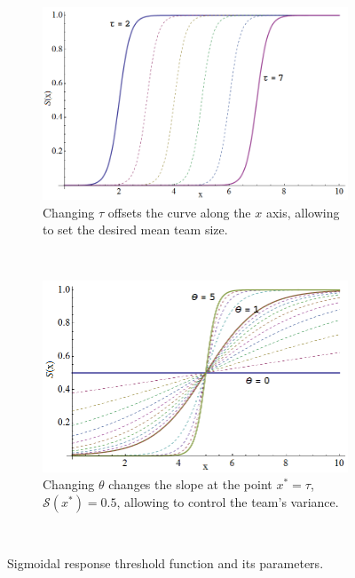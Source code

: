 \documentclass[defaultstyle,12pt]{thesis}
\newcommand{\Sig}{\mathcal{S}}  %
\begin{document}
\begin{figure}[!htb]
\centering\begin{subfigure}{.5\textwidth}
\centering\includegraphics[width=\textwidth]{../assets/sigmoid2.png}
\caption{Changing $\tau$ offsets the curve along the $x$ axis, allowing to set the desired mean team size.}\label{}
\end{subfigure}~
\centering\begin{subfigure}{.5\textwidth}
\centering\includegraphics[width=\textwidth]{../assets/sigmoid1.png}
\caption{Changing $\theta$ changes the slope at the point $x^* = \tau$, $\Sig(x^*) = 0.5$, allowing to control the team's variance.}\label{}
\end{subfigure}~
\caption{Sigmoidal response threshold function and its parameters.}\label{fig:sig}
\end{figure}
\end{document}
